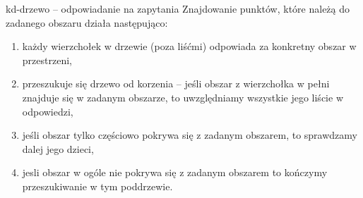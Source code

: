 \documentclass[aspectratio=169,dvipsnames]{beamer}
\begin{document}
\begin{frame}{kd-drzewo -- odpowiadanie na zapytania}
    Znajdowanie punktów, które należą do zadanego obszaru działa następująco:
    \begin{enumerate}
        \item<2-> każdy wierzchołek w drzewie (poza liśćmi) odpowiada za konkretny obszar w przestrzeni,
        \item<3-> przeszukuje się drzewo od korzenia -- jeśli obszar z wierzchołka w pełni znajduje się w zadanym obszarze, to uwzględniamy wszystkie jego liście w odpowiedzi,
        \item<4-> jeśli obszar tylko częściowo pokrywa się z zadanym obszarem, to sprawdzamy dalej jego dzieci,
        \item<5-> jesli obszar w ogóle nie pokrywa się z zadanym obszarem to kończymy przeszukiwanie w tym poddrzewie.
    \end{enumerate}
\end{frame}
\end{document}
